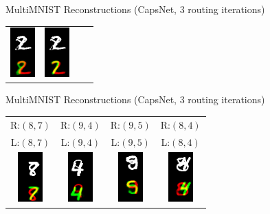 \documentclass{beamer}
\begin{document}
{\begin{frame}{MultiMNIST Reconstructions (CapsNet, 3 routing iterations)}
\begin{center}
\begin{tabular}{c c c c}
          \includegraphics[height=.3\textheight]{../img/recons/2_8_2_7_152} &
          \includegraphics[height=.3\textheight]{../img/recons/2_8_2_7_153p}
        \end{tabular}
      \end{center}
    \end{frame}

    \begin{frame}{MultiMNIST Reconstructions (CapsNet, 3 routing iterations)}
      \begin{center}
        \begin{tabular}{c c c c}
          R:$(8,7)$ & R:$(9,4)$ & R:$(9,5)$ & R:$(8,4)$ \\
          L:$(8,7)$ & L:$(9,4)$ & L:$(9,5)$ & L:$(8,4)$ \\
          \includegraphics[height=.3\textheight]{../img/recons/87} &
          \includegraphics[height=.3\textheight]{../img/recons/94} &
          \includegraphics[height=.3\textheight]{../img/recons/95} &
          \includegraphics[height=.3\textheight]{../img/recons/84} \\

\end{tabular}
\end{center}
\end{frame}}
\end{document}
